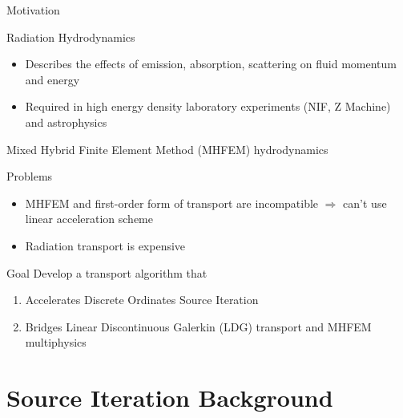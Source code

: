 \documentclass[10pt]{beamer}
\begin{document}

\begin{frame}{Motivation}

	\footnotesize
	Radiation Hydrodynamics 
	\vspace{-.05in}
	\begin{itemize}
		\item Describes the effects of emission, absorption, scattering on fluid momentum and energy 
		\item Required in high energy density laboratory experiments (NIF, Z Machine) and astrophysics 
	\end{itemize}

	Mixed Hybrid Finite Element Method (MHFEM) hydrodynamics 

	Problems
	\vspace{-.05in}
		\begin{itemize}
			\item MHFEM and first-order form of transport are incompatible $\Rightarrow$ can't use linear acceleration scheme 
			\item Radiation transport is expensive 
		\end{itemize}

	\begin{block}{Goal}
		Develop a transport algorithm that 
			\begin{enumerate} \vspace{-.05in}
				\item \alert<2>{Accelerates Discrete Ordinates Source Iteration}
				\item Bridges Linear Discontinuous Galerkin (LDG) transport and MHFEM multiphysics
			\end{enumerate}
		\vspace{-.05in}
	\end{block}

\end{frame}

\section{Source Iteration Background}
\end{document}
